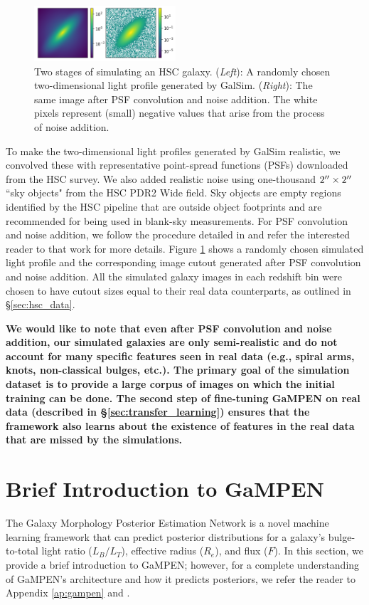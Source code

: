 \documentclass[linenumbers,twocolumn,twocolappendix]{aastex631}
\newcommand\gampen{GaMPEN}
\begin{document}
\begin{CJK*}{UTF8}{gbsn}
\begin{figure}[htb]
    \centering
    \includegraphics[width = 0.47\textwidth]{sim_process.png}
    \caption{Two stages of simulating an HSC galaxy. (\textit{Left}): A randomly chosen two-dimensional light profile generated by GalSim. (\textit{Right}): The same image after PSF convolution and noise addition. The white pixels represent (small) negative values that arise from the process of noise addition.}
    \label{fig:sim_process}
\end{figure}

To make the two-dimensional light profiles generated by GalSim realistic, we convolved these with representative point-spread functions (PSFs) downloaded from the HSC survey. We also added realistic noise using one-thousand $2\mbox{$^{\prime\prime}$}\times2\mbox{$^{\prime\prime}$}$ ``sky objects" from the HSC PDR2 Wide field. Sky objects are empty regions identified by the HSC pipeline that are outside object footprints and are recommended for being used in blank-sky measurements. For PSF convolution and noise addition, we follow the procedure detailed in \citet{gampen_software_paper} and refer the interested reader to that work for more details. Figure \ref{fig:sim_process} shows a randomly chosen simulated light profile and the corresponding image cutout generated after PSF convolution and noise addition. All the simulated galaxy images in each redshift bin were chosen to have cutout sizes equal to their real data counterparts, as outlined in \S \ref{sec:hsc_data}. 

\textbf{We would like to note that even after PSF convolution and noise addition, our simulated galaxies are only semi-realistic and do not account for many specific features seen in real data (e.g., spiral arms, knots, non-classical bulges, etc.). The primary goal of the simulation dataset is to provide a large corpus of images on which the initial training can be done. The second step of fine-tuning \gampen{} on real data (described in \S \ref{sec:transfer_learning}) ensures that the framework also learns about the existence of features in the real data that are missed by the simulations.}

\section{Brief Introduction to \gampen{}} \label{sec:gampen}
The Galaxy Morphology Posterior Estimation Network \citep[\gampen{};][]{gampen_software_paper} is a novel machine learning framework that can predict posterior distributions for a galaxy's bulge-to-total light ratio ($L_B/L_T$), effective radius ($R_e$), and flux ($F$). In this section, we provide a brief introduction to \gampen{}; however, for a complete understanding of \gampen{}'s architecture and how it predicts posteriors, we refer the reader to Appendix \ref{ap:gampen} and \citet{gampen_software_paper}.


\end{CJK*}
\end{document}
